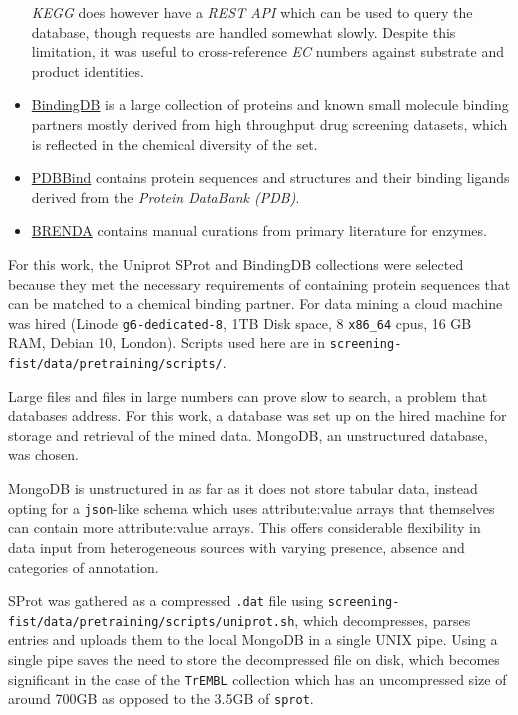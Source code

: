 \documentclass[16pt]{book}
\begin{document}
\begin{itemize}
		\textit{KEGG} does however have a \textit{REST API} which can be used to query the database, though requests are handled somewhat slowly.
		Despite this limitation, it was useful to cross-reference \textit{EC} numbers against substrate and product identities.
	\item \href{https://www.bindingdb.org/bind/index.jsp}{BindingDB} is a large collection of proteins and known small molecule binding partners mostly derived from high throughput drug screening datasets, which is reflected in the chemical diversity of the set.
	\item \href{http://pdbbind.org.cn/}{PDBBind} contains protein sequences and structures and their binding ligands derived from the \textit{Protein DataBank (PDB)}.
	\item \href{https://www.brenda-enzymes.org/}{BRENDA} contains manual curations from primary literature for enzymes.
\end{itemize}


For this work, the Uniprot SProt and BindingDB collections were selected because they met the necessary requirements of containing protein sequences that can be matched to a chemical binding partner.
For data mining a cloud machine was hired (Linode \texttt{g6-dedicated-8}, 1TB Disk space, 8 \texttt{x86\_64} cpus, 16 GB RAM, Debian 10, London).
Scripts used here are in \texttt{screening-fist/data/pretraining/scripts/}.

Large files and files in large numbers can prove slow to search, a problem that databases address.
For this work, a database was set up on the hired machine for storage and retrieval of the mined data.
MongoDB, an unstructured database, was chosen. 

MongoDB is unstructured in as far as it does not store tabular data, instead opting for a \texttt{json}-like schema which uses attribute:value arrays that themselves can contain more attribute:value arrays.
This offers considerable flexibility in data input from heterogeneous sources with varying presence, absence and categories of annotation.

SProt was gathered as a compressed \texttt{.dat} file using \texttt{screening-fist/data/pretraining/scripts/uniprot.sh}, which decompresses, parses entries and uploads them to the local MongoDB in a single UNIX pipe.
Using a single pipe saves the need to store the decompressed file on disk, which becomes significant in the case of the \texttt{TrEMBL} collection which has an uncompressed size of around 700GB as opposed to the 3.5GB of \texttt{sprot}.
\end{document}

